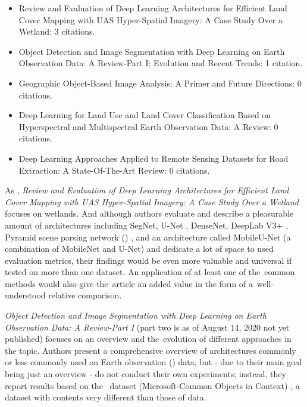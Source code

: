 \begin{itemize}
	\item Review and Evaluation of Deep Learning Architectures for Efficient Land Cover Mapping with UAS Hyper-Spatial Imagery: A Case Study Over a Wetland: 3 citations. \cite{review-dl-wetlands}
	\item Object Detection and Image Segmentation with Deep Learning on Earth Observation Data: A Review-Part I: Evolution and Recent Trends: 1 citation. \cite{review-dl-eo}
	\item Geographic Object-Based Image Analysis: A Primer and Future Directions: 0 citations. \cite{geobia}
	\item Deep Learning for Land Use and Land Cover Classification Based on Hyperspectral and Multispectral Earth Observation Data: A Review: 0 citations. \cite{review-dl-lulc}
	\item Deep Learning Approaches Applied to Remote Sensing Datasets for Road Extraction: A State-Of-The-Art Review: 0 citations. \cite{review-dl-road-extraction}
\end{itemize}

As \cite{very-deep-cnn-lc}, \textit{Review and Evaluation of Deep Learning Architectures for Efficient Land Cover Mapping with UAS Hyper-Spatial Imagery: A Case Study Over a Wetland} focuses on wetlands. And although authors evaluate and describe a pleasurable amount of architectures including SegNet, U-Net \cite{u-net}, DenseNet, DeepLab V3+ \cite{deeplab}, Pyramid scene parsing network () \cite{pspnet}, and an architecture called MobileU-Net (a combination of MobileNet \cite{mobilenet} and U-Net) and dedicate a lot of space to used evaluation metrics, their findings would be even more valuable and universal if tested on more than one dataset. An application of at least one of the~common  methods would also give the~article an added value in the form of a~well-understood relative comparison.

\textit{Object Detection and Image Segmentation with Deep Learning on Earth Observation Data: A Review-Part I} (part two is as of August 14, 2020 not yet published) focuses on an overview and the~evolution of different approaches in the topic. Authors present a comprehensive overview of  architectures commonly or less commonly used on Earth observation () data, but - due to their main goal being just an overview - do not conduct their own experiments; instead, they report results based on the~ dataset (Microsoft-Common Objects in Context) \cite{coco}, a dataset with contents very different than those of  data.

